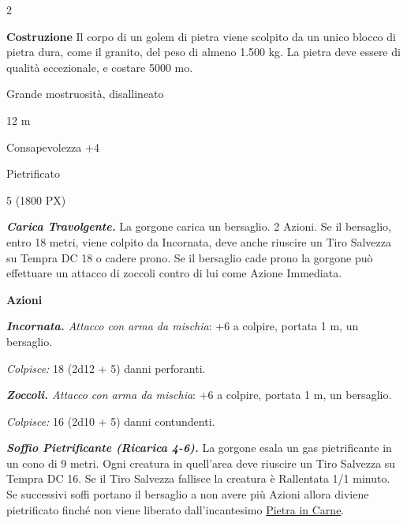 \begin{multicols}{2}
{\textbf{Costruzione}
Il corpo di un golem di pietra viene scolpito da un unico blocco di pietra dura, come il granito, del peso di almeno 1.500 kg. La pietra deve essere di qualità eccezionale, e costare 5000 mo.

\begin{description}[noitemsep, topsep=0pt, parsep=0pt, partopsep=0pt, itemsep=1pt, leftmargin=2.35cm,  labelwidth=2.2cm, itemindent=0cm, listparindent=0pt] %
\setlength{\baselineskip}{10pt}
\item[\textbf{Taglia/Tipo}] Grande mostruosità, disallineato
\item[\textbf{Caratt.}] 
\item[\textbf{Punti Ferita}] 
\item[\textbf{Movimento}] 12 m
\item[\textbf{Tiri Salvez.}] 
\item[\textbf{Comp.}] Consapevolezza +4
\item[\textbf{Immunità}] Pietrificato
\item[\textbf{Sensi}] 
\item[\textbf{Sfida}] 5 (1800 PX)
\end{description}
\smallskip

\emph{\textbf{Carica Travolgente.}} La gorgone carica un bersaglio. 2 Azioni. Se il bersaglio, entro 18 metri, viene colpito da Incornata, deve anche riuscire un Tiro Salvezza su Tempra DC 18 o cadere prono. Se il bersaglio cade prono la gorgone può effettuare un attacco di zoccoli contro di lui come Azione Immediata.

\textbf{Azioni}

\emph{\textbf{Incornata.} Attacco con arma da mischia}: +6 a colpire, portata 1 m, un bersaglio.

\emph{Colpisce:} 18 (2d12 + 5) danni perforanti.

\emph{\textbf{Zoccoli.} Attacco con arma da mischia}: +6 a colpire, portata 1 m, un bersaglio.

\emph{Colpisce:} 16 (2d10 + 5) danni contundenti.

\emph{\textbf{Soffio Pietrificante (Ricarica 4-6).}} La gorgone esala un gas pietrificante in un cono di 9 metri. Ogni creatura in quell'area deve riuscire un Tiro Salvezza su Tempra DC 16. Se il Tiro Salvezza fallisce la creatura è Rallentata 1/1 minuto. Se successivi soffi portano il bersaglio a non avere più Azioni allora diviene pietrificato finché non viene liberato dall'incantesimo \hyperlink{Pietra in Carne}{Pietra in Carne}.

}
\end{multicols}
